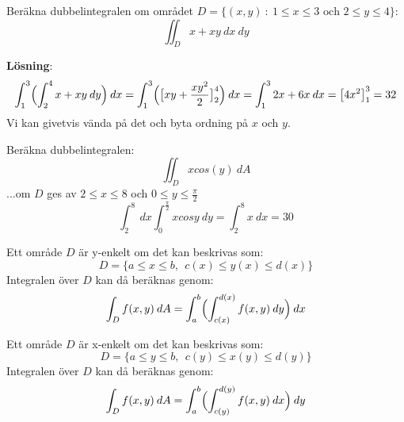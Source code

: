 \documentclass{report}
\begin{document}
\pagebreak
\ex{}
{
	Beräkna dubbelintegralen om området $ D = \{ (x,y) \: : \: 1 \le x \le 3 \text{ och } 2 \le y \le 4 \}$:
\begin{equation*}
\iint_{D}^{} x+xy \: dx   \: dy 
\end{equation*}

\textbf{Lösning}:\\
\begin{equation*}
	\int_{1}^{3} \Bigl( \int_{2}^{4} x+xy \: dy   \Bigr) \: dx = \int_{1}^{3} \Bigl( \bigl[ xy+ \frac{xy^2}{2}   \bigr]_{2}^{4}  \Bigr) \: dx = \int_{1}^{3} 2x+6x \: dx = \bigl[ 4x^2 \bigr]_{1}^{3} = 32    
\end{equation*}
Vi kan givetvis vända på det och byta ordning på $ x $ och $ y $.
}

\qs{}
{
Beräkna dubbelintegralen:
\begin{equation*}
\iint_{D}^{} xcos(y) \: dA 
\end{equation*}
...om $ D $ ges av $ 2 \le x \le 8 $ och $ 0 \le y \le \frac{\pi}{2}  $ 
}
\sol
\begin{equation*}
\int_{2}^{8}  \: dx \int_{0}^{ \frac{\pi}{2}  } xcosy \: dy = \int_{2}^{8} x \: dx = 30   
\end{equation*}

\vspace{20pt}
{
Ett område $ D $ är y-enkelt om det kan beskrivas som:
\begin{equation*}
	D = \{ a \le x \le b, \: \: c(x) \le y(x) \le d(x) \}
\end{equation*}
Integralen över $ D $ kan då beräknas genom:
\begin{equation*}
\int_{D}^{} f(x,y) \: dA = \int_{a}^{b} \Bigl( \int_{c(x)}^{d(x)} f(x,y) \: dy   \Bigr) \: dx  
\end{equation*}
}

{
Ett område $ D $ är x-enkelt om det kan beskrivas som:
\begin{equation*}
	D  = \{ a \le y \le b, \: \: c(y) \le x(y) \le d(y)  \}
\end{equation*}
Integralen över $ D $ kan då beräknas genom:
\begin{equation*}
\int_{D}^{} f(x,y) \: dA = \int_{a}^{b} \Bigl( \int_{c(y)}^{d(y)} f(x,y) \: dx   \Bigr) \: dy  
\end{equation*}
}
\end{document}
